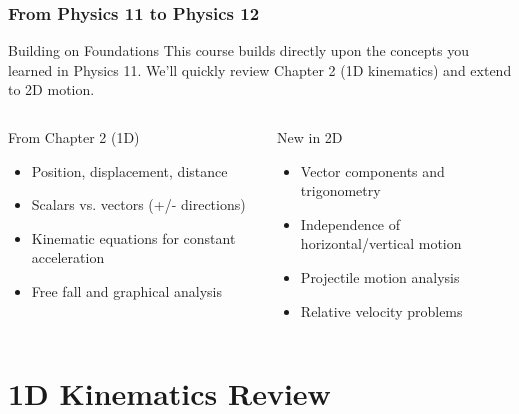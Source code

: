 \documentclass{beamer}
\begin{document}
\begin{frame}
\frametitle{From Physics 11 to Physics 12}
\begin{block}{Building on Foundations}
This course builds directly upon the concepts you learned in Physics 11. We'll quickly review Chapter 2 (1D kinematics) and extend to 2D motion.
\end{block}

\begin{columns}[T]
    \begin{column}{0.5\textwidth}
        \alert{From Chapter 2 (1D)}
        \begin{itemize}
            \item<2-> Position, displacement, distance
            \item<3-> Scalars vs. vectors (+/- directions)
            \item<4-> Kinematic equations for constant acceleration
            \item<5-> Free fall and graphical analysis
        \end{itemize}
    \end{column}
    \begin{column}{0.5\textwidth}
        \alert{New in 2D}
        \begin{itemize}
            \item<2-> Vector components and trigonometry
            \item<3-> Independence of horizontal/vertical motion
            \item<4-> Projectile motion analysis
            \item<5-> Relative velocity problems
        \end{itemize}
    \end{column}
\end{columns}
\end{frame}

\section{1D Kinematics Review}
\end{document}
